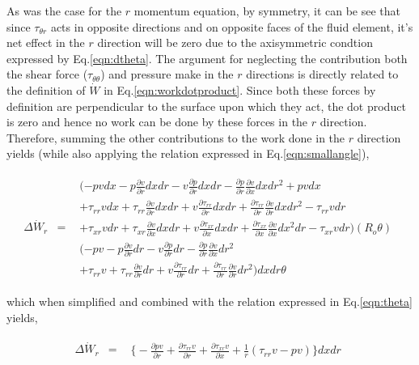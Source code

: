 	As was the case for the $r$ momentum equation, by symmetry, it can be see that since $\tau_{\theta r}$ 
acts in opposite directions and on opposite faces of the fluid element, it's net effect in the $r$ direction will
be zero due to the axisymmetric condtion expressed by Eq.\ref{eqn:dtheta}.  The argument for neglecting the contribution both the shear force ($\tau_{\theta \theta}$) and pressure make in the $r$
directions is directly related to the definition of $\dot{W}$ in Eq.\ref{eqn:workdotproduct}.  Since both these forces
by definition are perpendicular to the surface upon which they act, the dot product is zero and hence no work can be
done by these forces in the $r$ direction.  Therefore, summing the other contributions to the work done in the $r$ 
direction yields (while also applying	the relation expressed in Eq.\ref{eqn:smallangle}),

\begin{displaymath}
	\begin{array}{ccc}
		\Delta \dot{W}_r & = &
			\begin{array}{c} 
		(-p vdx - p \frac{\partial v}{\partial r}dxdr - v \frac{\partial p}{\partial r}dxdr 
		- \frac{\partial p}{\partial r} \frac{\partial v}{\partial x}dxdr^2 + p vdx \\
		+ \tau_{rr}vdx + \tau_{rr} \frac{\partial v}{\partial r}dxdr + v \frac{\partial \tau_{rr}}{\partial r}dxdr
		+ \frac{\partial \tau_{rr}}{\partial r} \frac{\partial v}{\partial r} dxdr^2 - \tau_{rr}vdr \\
		+ \tau_{xr}vdr + \tau_{xr} \frac{\partial v}{\partial x}dxdr + v \frac{\partial \tau_{xr}}{\partial x}dxdr
		+ \frac{\partial \tau_{xr}}{\partial x} \frac{\partial v}{\partial x} dx^2dr - \tau_{xr}vdr)	
		(R_o \theta) \\
		(-p v - p \frac{\partial v}{\partial r}dr - v \frac{\partial p}{\partial r}dr 
		- \frac{\partial p}{\partial r} \frac{\partial v}{\partial x}dr^2 \\
		+ \tau_{rr}v + \tau_{rr} \frac{\partial v}{\partial r}dr + v \frac{\partial \tau_{rr}}{\partial r}dr
		+ \frac{\partial \tau_{rr}}{\partial r} \frac{\partial v}{\partial r} dr^2)dxdr \theta
			\end{array}
	\end{array}
\end{displaymath}

	which when simplified and combined with the relation expressed in Eq.\ref{eqn:theta} yields,

\begin{displaymath}
	\begin{array}{ccc}
		\Delta \dot{W}_r & = &
			\begin{array}{c} 
		\Big\{-\frac{\partial pv}{\partial r} + \frac{\partial \tau_{rr}v}{\partial r}
		+ \frac{\partial \tau_{xr}v}{\partial x} + \frac{1}{r}(\tau_{rr}v -p v)\Big\}dxdr 
			\end{array}
	\end{array}
\end{displaymath}


